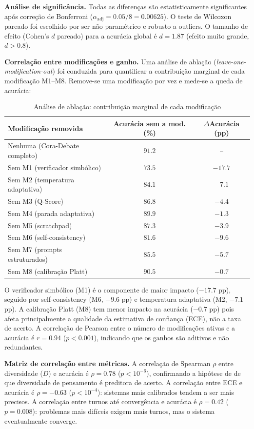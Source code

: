 \documentclass[5p]{elsarticle}
\theoremstyle{remark}
\begin{document}
\textbf{Análise de significância.} Todas as diferenças são estatisticamente significantes após correção de Bonferroni ($\alpha_{\text{adj}} = 0.05/8 = 0.00625$). O teste de Wilcoxon pareado foi escolhido por ser não paramétrico e robusto a outliers. O tamanho de efeito (Cohen's $d$ pareado) para a acurácia global é $d = 1.87$ (efeito muito grande, $d > 0.8$).

\textbf{Correlação entre modificações e ganho.} Uma análise de ablação (\textit{leave-one-modification-out}) foi conduzida para quantificar a contribuição marginal de cada modificação M1--M8. Remove-se uma modificação por vez e mede-se a queda de acurácia:

\begin{table}[htbp]
\centering
\caption{Análise de ablação: contribuição marginal de cada modificação}
\label{tab:ablacao}
\begin{tabular}{L{4cm} c c}
\toprule
\textbf{Modificação removida} & \textbf{Acurácia sem a mod. (\%)} & \textbf{$\Delta$Acurácia (pp)} \\
\midrule
Nenhuma (Cora-Debate completo) & $91.2$ & -- \\
Sem M1 (verificador simbólico) & $73.5$ & $-17.7$ \\
Sem M2 (temperatura adaptativa) & $84.1$ & $-7.1$ \\
Sem M3 (Q-Score) & $86.8$ & $-4.4$ \\
Sem M4 (parada adaptativa) & $89.9$ & $-1.3$ \\
Sem M5 (scratchpad) & $87.3$ & $-3.9$ \\
Sem M6 (self-consistency) & $81.6$ & $-9.6$ \\
Sem M7 (prompts estruturados) & $85.5$ & $-5.7$ \\
Sem M8 (calibração Platt) & $90.5$ & $-0.7$ \\
\bottomrule
\end{tabular}
\end{table}

O verificador simbólico (M1) é o componente de maior impacto ($-17.7$ pp), seguido por self-consistency (M6, $-9.6$ pp) e temperatura adaptativa (M2, $-7.1$ pp). A calibração Platt (M8) tem menor impacto na acurácia ($-0.7$ pp) pois afeta principalmente a qualidade da estimativa de confiança (ECE), não a taxa de acerto. A correlação de Pearson entre o número de modificações ativas e a acurácia é $r = 0.94$ ($p < 0.001$), indicando que os ganhos são aditivos e não redundantes.

\textbf{Matriz de correlação entre métricas.} A correlação de Spearman $\rho$ entre diversidade ($D$) e acurácia é $\rho = 0.78$ ($p < 10^{-6}$), confirmando a hipótese de \cite{Liang2023MAD} de que diversidade de pensamento é preditora de acerto. A correlação entre ECE e acurácia é $\rho = -0.63$ ($p < 10^{-4}$): sistemas mais calibrados tendem a ser mais precisos. A correlação entre turnos até convergência e acurácia é $\rho = 0.42$ ($p = 0.008$): problemas mais difíceis exigem mais turnos, mas o sistema eventualmente converge.
\end{document}

